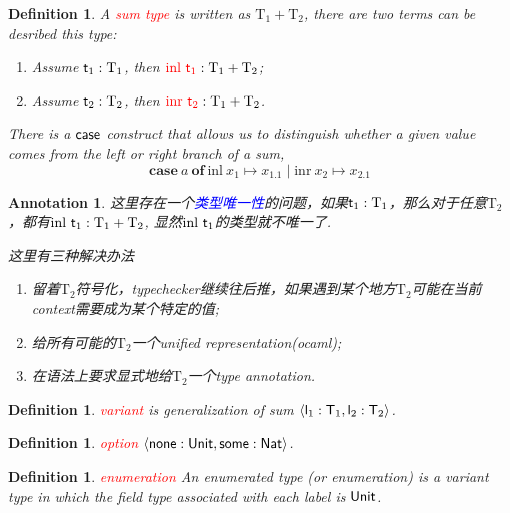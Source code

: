 \documentclass{article}
\theoremstyle{plain}
\newtheorem{definition}[theorem]{Definition}
\newtheorem{annotation}[theorem]{Annotation}
\theoremstyle{nonumberplain}
\newcommand{\inl}[1]{\ensuremath{\text{inl}~#1}}
\newcommand{\inr}[1]{\ensuremath{\text{inr}~#1}}
\newcommand{\projone}[1]{\ensuremath{#1.1}}
\newcommand{\caseof}[3]{\ensuremath{{\textbf{case}}~#1~{\textbf{of}}~\inl{x_1}\mapsto #2\mid\inr{x_2}\mapsto #3}}
\newcommand{\singletype}[1]{\text{#1}}
\newcommand{\termtype}[2]{\ensuremath{#1:#2}}
\newcommand{\term}[1]{\ensuremath\mathsf{#1}}
\newcommand{\redt}[1]{\textcolor{red}{#1}}
\newcommand{\bluet}[1]{\textcolor{blue}{#1}}
\begin{document}
\begin{definition}
\rm A \redt{sum type} is written as $\singletype{T}_1 + \singletype{T}_2$, there are two terms can be desribed this type: 
\begin{enumerate}
	\item Assume $\termtype{\term{t}_1}{\singletype{T}_1}$, then $\termtype{\redt{\inl{\term{t}_1}}}{\singletype{T}_1 + \singletype{T}_2}$;
	\item Assume $\termtype{\term{t}_2}{\singletype{T}_2}$, then $\termtype{\redt{\inr{\term{t}_2}}}{\singletype{T}_1 + \singletype{T}_2}$.
\end{enumerate}
There is a $\term{case}$ construct that allows us to distinguish whether a given value comes from the left or right branch of a sum,
$$
\caseof{a}{\projone{x_1}}{\projone{x_2}}
$$
\end{definition}


\begin{annotation}
\rm 这里存在一个\bluet{类型唯一性}的问题，如果$\termtype{\term{t}_1}{\singletype{T}_1}$，那么对于任意$\singletype{T}_2$，都有$\termtype{\inl{\term{t}_1}}{\singletype{T}_1 + \singletype{T}_2}$, 显然$\inl{\term{t}_1}$的类型就不唯一了. 

这里有三种解决办法
\begin{enumerate}
	\item 留着$\singletype{T}_2$符号化，typechecker继续往后推，如果遇到某个地方$\singletype{T}_2$可能在当前context需要成为某个特定的值;
	\item 给所有可能的$\singletype{T}_2$一个unified representation(ocaml);
	\item 在语法上要求显式地给$\singletype{T}_2$一个type annotation. 
\end{enumerate}
\end{annotation}

\begin{definition}
\rm \redt{variant} is generalization of sum $\left<\term{l}_1:\term{T}_1, \term{l}_2:\term{T}_2\right>$. 
\end{definition}

\begin{definition}
\rm \redt{option} $\left<\term{none}:\term{Unit}, \term{some}:\term{Nat} \right>$. 
\end{definition}

\begin{definition}
\rm \redt{enumeration} An enumerated type (or enumeration) is a variant type in which the field type associated with each label is $\term{Unit}$.
\end{definition}
\end{document}
